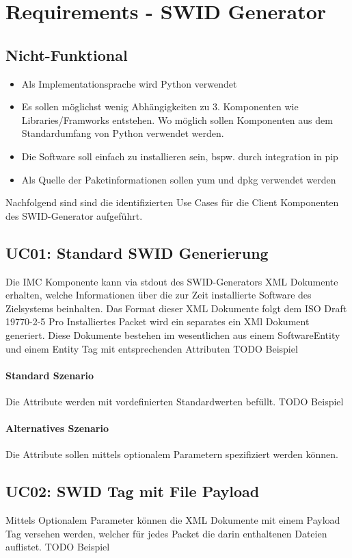 \section{Requirements - SWID Generator}
\subsection{Nicht-Funktional}
\begin{itemize}
\item Als Implementationsprache wird Python verwendet
\item Es sollen möglichst wenig Abhängigkeiten zu 3. Komponenten wie Libraries/Framworks entstehen. Wo möglich sollen Komponenten aus dem Standardumfang von Python verwendet werden.
\item Die Software soll einfach zu installieren sein, bspw. durch integration in pip
\item Als Quelle der Paketinformationen sollen yum und dpkg verwendet werden
\end{itemize}
Nachfolgend sind sind die identifizierten Use Cases für die Client Komponenten des SWID-Generator aufgeführt.
\subsection*{UC01: Standard SWID Generierung}
Die IMC Komponente kann via stdout des SWID-Generators XML Dokumente erhalten, welche Informationen über die zur Zeit installierte Software des Zielsystems beinhalten.
Das Format dieser XML Dokumente folgt dem ISO Draft 19770-2-5
Pro Installiertes Packet wird ein separates ein XMl Dokument generiert.
Diese Dokumente bestehen im wesentlichen aus einem SoftwareEntity und einem Entity Tag mit entsprechenden Attributen TODO Beispiel

\paragraph{Standard Szenario}
Die Attribute werden mit vordefinierten Standardwerten befüllt.
TODO Beispiel
\paragraph{Alternatives Szenario}
Die Attribute sollen mittels optionalem Parametern spezifiziert werden können.

\subsection*{UC02: SWID Tag mit File Payload}
Mittels Optionalem Parameter können die XML Dokumente mit einem Payload Tag versehen werden, welcher für jedes Packet die darin enthaltenen Dateien auflistet.
TODO Beispiel

